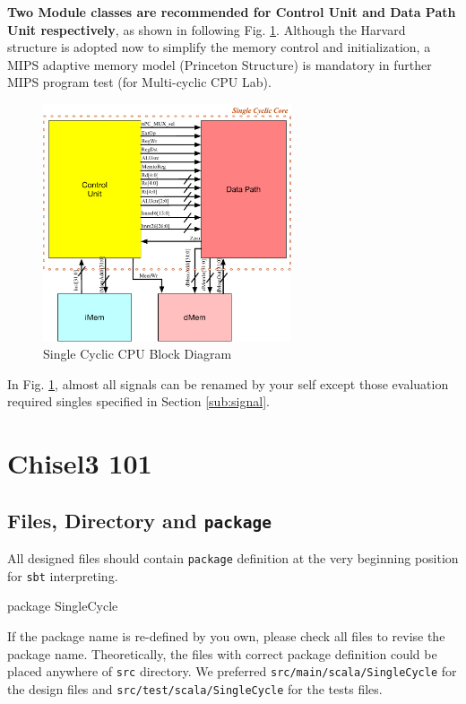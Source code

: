 \documentclass[a4paper]{article}
\def\code#1{{\tt #1}}
\begin{document}
\textbf{Two Module classes are recommended for Control Unit and Data Path Unit respectively}, as shown in following Fig. \ref{fig:modules}. Although the Harvard structure is adopted now to simplify the memory control and initialization, a MIPS adaptive memory model (Princeton Structure) is mandatory in further MIPS program test (for Multi-cyclic CPU Lab).  
\begin{figure}[ht]
 \centering
 \includegraphics[height=7cm]{images/l1modules.pdf}
 \caption{Single Cyclic CPU Block Diagram}
 \label{fig:modules}
\end{figure}
In Fig. \ref{fig:modules}, almost all signals can be renamed by your self except those evaluation required singles specified in Section \ref{sub:signal}.

\newpage
\section{Chisel3 101} \label{Datatypes}%
\subsection{Files, Directory and \code{package}}\label{sub:package}
All designed files should contain \code{package} definition at the very beginning position for \code{sbt} interpreting.
\begin{scala} 
package SingleCycle
\end{scala} 
If the package name is re-defined by you own, please check all files to revise the package name.
Theoretically,  the files with correct package definition could be placed anywhere of \code{src} directory. We preferred \code{src/main/scala/SingleCycle} for the design files and \code{src/test/scala/SingleCycle} for the tests files.
\end{document}

